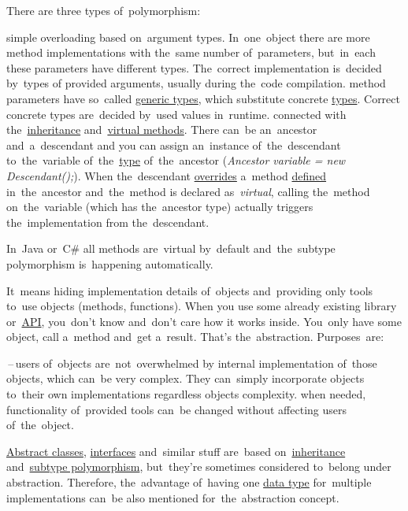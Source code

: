 \noindent There are three types of~polymorphism:
\begin{itemize}
     simple overloading based on~argument types.
             In~one~object there are more method implementations with the~same number of~parameters, but~in~each these parameters have different types.
             The~correct implementation is~decided by~types of provided arguments, usually during the~code compilation.
     method parameters have so~called \hyperref[javagenerics]{generic types}, which substitute concrete \hyperref[datatypes]{types}.
             Correct concrete types are~decided by~used values in~runtime.
     connected with the~\hyperref[inheritance]{inheritance} and~\hyperref[javavirtualmethods]{virtual methods}.
             There can~be an~ancestor and~a~descendant and you can assign an~instance of~the~descendant to~the~variable of~the~\hyperref[datatype]{type} of~the~ancestor (\textit{Ancestor variable = new Descendant();}).
             When the~descendant \hyperref[javaoverride]{overrides} a~method \hyperref[declarationdefinition]{defined} in~the~ancestor and~the~method is declared as~\textit{virtual}, calling the~method on~the~variable (which has the~ancestor type) actually triggers the~implementation from the~descendant.
\end{itemize}

\warning In~Java or~C\# all methods are~virtual by~default and~the~subtype polymorphism is~happening automatically.

\label{abstraction}
It~means hiding implementation details of~objects and~providing only tools to~use objects (methods, functions).
When you use some already existing library or~\hyperref[api]{API}, you~don't know and~don't care how it works inside.
You~only have some object, call a~method and~get a~result.
That's the~abstraction.
Purposes~are:
\begin{itemize}
    \,--\,users of~objects are~not~overwhelmed by internal implementation of~those objects, which can~be very complex.
            They can~simply incorporate objects to~their own implementations regardless objects complexity.
     when needed, functionality of~provided tools can~be changed without affecting users of~the~object.
\end{itemize}

\warning \hyperref[javaabstractclasses]{Abstract classes}, \hyperref[javainterfaces]{interfaces} and~similar stuff are~based on~\hyperref[inheritance]{inheritance} and~\hyperref[polymorphism]{subtype polymorphism}, but~they're sometimes considered to~belong under abstraction.
Therefore, the~advantage of~having one \hyperref[datatypes]{data type} for~multiple implementations can~be also mentioned for~the~abstraction concept.

